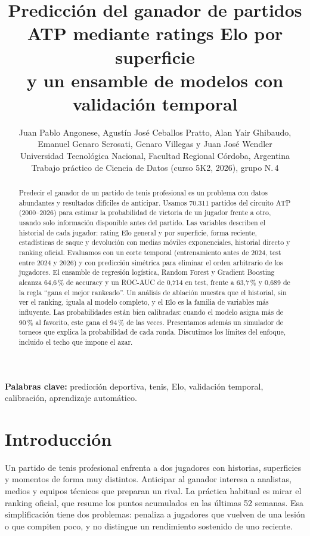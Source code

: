 \documentclass[11pt,a4paper]{article}
\title{\textbf{Predicción del ganador de partidos ATP mediante ratings Elo por superficie\\y un ensamble de modelos con validación temporal}}
\author{
  Juan Pablo Angonese, Agustín José Ceballos Pratto, Alan Yair Ghibaudo,\\
  Emanuel Genaro Scrosati, Genaro Villegas y Juan José Wendler\\[4pt]
  \small Universidad Tecnológica Nacional, Facultad Regional Córdoba, Argentina\\
  \small Trabajo práctico de Ciencia de Datos (curso 5K2, 2026), grupo N.\textordmasculine\,4
}
\date{}
\begin{document}
\maketitle

\begin{abstract}
Predecir el ganador de un partido de tenis profesional es un problema con datos abundantes y resultados difíciles de anticipar. Usamos 70.311 partidos del circuito ATP (2000--2026) para estimar la probabilidad de victoria de un jugador frente a otro, usando solo información disponible antes del partido. Las variables describen el historial de cada jugador: rating Elo general y por superficie, forma reciente, estadísticas de saque y devolución con medias móviles exponenciales, historial directo y ranking oficial. Evaluamos con un corte temporal (entrenamiento antes de 2024, test entre 2024 y 2026) y con predicción simétrica para eliminar el orden arbitrario de los jugadores. El ensamble de regresión logística, Random Forest y Gradient Boosting alcanza 64,6\,\% de accuracy y un ROC-AUC de 0,714 en test, frente a 63,7\,\% y 0,689 de la regla ``gana el mejor rankeado''. Un análisis de ablación muestra que el historial, sin ver el ranking, iguala al modelo completo, y el Elo es la familia de variables más influyente. Las probabilidades están bien calibradas: cuando el modelo asigna más de 90\,\% al favorito, este gana el 94\,\% de las veces. Presentamos además un simulador de torneos que explica la probabilidad de cada ronda. Discutimos los límites del enfoque, incluido el techo que impone el azar.
\end{abstract}

\noindent\textbf{Palabras clave:} predicción deportiva, tenis, Elo, validación temporal, calibración, aprendizaje automático.

\section{Introducción}

Un partido de tenis profesional enfrenta a dos jugadores con historias, superficies y momentos de forma muy distintos. Anticipar al ganador interesa a analistas, medios y equipos técnicos que preparan un rival. La práctica habitual es mirar el ranking oficial, que resume los puntos acumulados en las últimas 52 semanas. Esa simplificación tiene dos problemas: penaliza a jugadores que vuelven de una lesión o que compiten poco, y no distingue un rendimiento sostenido de uno reciente.
\end{document}
